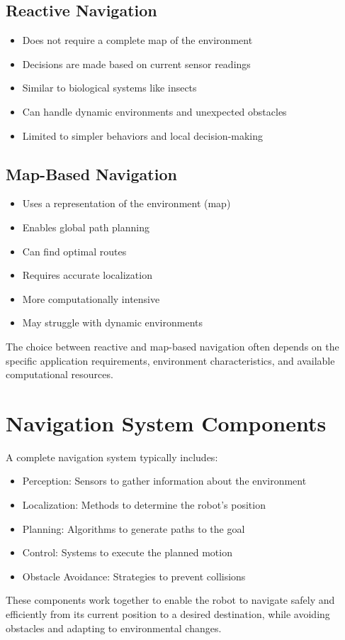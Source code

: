 \documentclass[openany]{book}
\theoremstyle{definition}
\theoremstyle{remark}
\newcommand{\note}[1]{
\begin{tcolorbox}[colback=green!5,colframe=green!40!black,title=Note]
 #1
\end{tcolorbox}
}
\begin{document}
\subsection{Reactive Navigation}
\begin{itemize}
    \item Does not require a complete map of the environment
    \item Decisions are made based on current sensor readings
    \item Similar to biological systems like insects
    \item Can handle dynamic environments and unexpected obstacles
    \item Limited to simpler behaviors and local decision-making
\end{itemize}

\subsection{Map-Based Navigation}
\begin{itemize}
    \item Uses a representation of the environment (map)
    \item Enables global path planning
    \item Can find optimal routes
    \item Requires accurate localization
    \item More computationally intensive
    \item May struggle with dynamic environments
\end{itemize}

\note{The choice between reactive and map-based navigation often depends on the specific application requirements, environment characteristics, and available computational resources.}

\section{Navigation System Components}
A complete navigation system typically includes:
\begin{itemize}
    \item Perception: Sensors to gather information about the environment
    \item Localization: Methods to determine the robot's position
    \item Planning: Algorithms to generate paths to the goal
    \item Control: Systems to execute the planned motion
    \item Obstacle Avoidance: Strategies to prevent collisions
\end{itemize}

These components work together to enable the robot to navigate safely and efficiently from its current position to a desired destination, while avoiding obstacles and adapting to environmental changes.
\end{document}
